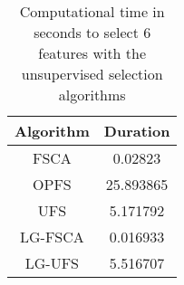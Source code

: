 \begin{table}
	\begin{center}
		\begin{tabular}{c c}
			Algorithm & Duration \\
			\hline
			FSCA & 0.02823 \\
			OPFS & 25.893865 \\
			UFS & 5.171792 \\
			LG-FSCA & 0.016933 \\
			LG-UFS & 5.516707 \\
		\end{tabular}
	\end{center}
	\caption{Computational time in seconds to select 6 features with the unsupervised selection algorithms}
\end{table}